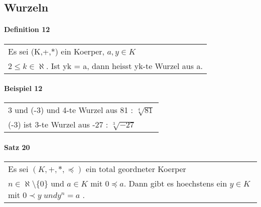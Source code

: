 \documentclass{scrartcl}
\begin{document}
\subsection{Wurzeln}

\paragraph{Definition 12}
\begin{tabbing}
\begin{tabular}{l}
Es sei (K,+,*) ein Koerper, $a,y\in K$\\
$ 2 \leq k \in \aleph $. Ist yk = a, dann heisst yk-te Wurzel aus a.\\
\end{tabular}
\end{tabbing}

\paragraph{Beispiel 12}
\begin{tabbing}
\begin{tabular}{l}
3 und (-3) und 4-te Wurzel aus 81 : $\sqrt[4]{81}$\\
(-3) ist 3-te Wurzel aus -27 : $\sqrt[3]{-27}$
\end{tabular}
\end{tabbing}

\paragraph{Satz 20}
\begin{tabbing}
\begin{tabular}{l}
Es sei $(K,+,*,\preceq)$ ein total geordneter Koerper \\
$ n\in \aleph \setminus \{ 0\} $ und $a\in K$ mit $ 0 \preceq a$.
Dann gibt es hoechstens ein $y\in K$ mit $0 \prec y \; und y^n = a$ .\\
\end{tabular}
\end{tabbing}
\end{document}
